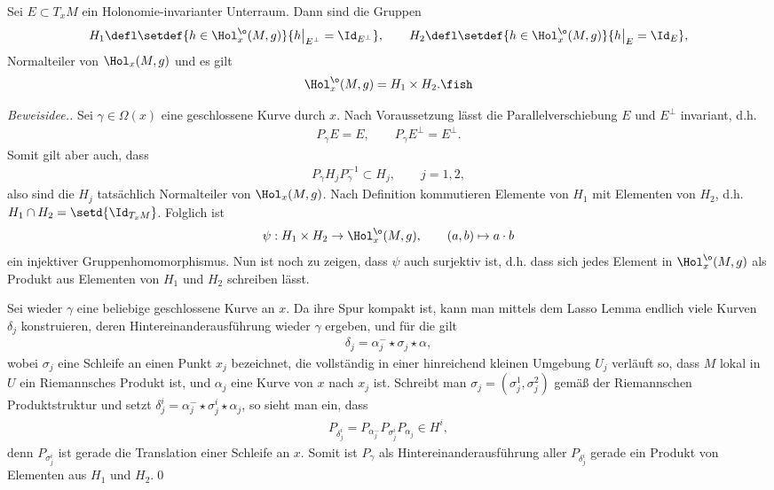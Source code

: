 \documentclass[%
	paper=a5,%
	fleqn,%
	DIV=18,%
	BCOR=0mm,
	fontsize=11pt,
	titlepage=false,%
	bibliography=totoc,
	DIV=18,%
	twoside=true,
	pdftitle=Riemannsche Geometrie,
	pdfauthor=Uwe Semmelmann,
	numbers=noendperiod]%
	{scrbook}
\begin{document}
\begin{prop}
Sei $E\subset T_{x}M$ ein Holonomie-invarianter Unterraum. Dann sind die Gruppen
\begin{align*}
H_{1} \defl \setdef{h\in \Hol_{x}^\o(M,g)}{h\big|_{E^\bot} = \Id_{E^\bot}},\qquad
H_{2} \defl \setdef{h\in \Hol_{x}^\o(M,g)}{h\big|_{E} = \Id_{E}},
\end{align*}
Normalteiler von $\Hol_{x}(M,g)$ und es gilt
\begin{align*}
\Hol_{x}^\o(M,g) = H_{1}\times H_{2}.\fish
\end{align*}
\end{prop}
\begin{proof}[Beweisidee.]
Sei $\gamma\in\Omega(x)$ eine geschlossene Kurve durch $x$. Nach Voraussetzung lässt die Parallelverschiebung $E$ und $E^\bot$ invariant, d.h.
\begin{align*}
P_{\gamma}E = E,\qquad P_{\gamma}E^\bot = E^\bot.
\end{align*}
Somit gilt aber auch, dass
\begin{align*}
P_{\gamma} H_{j} P_{\gamma}^{-1} \subset H_{j},\qquad j=1,2,
\end{align*}
also sind die $H_{j}$ tatsächlich Normalteiler von $\Hol_{x}(M,g)$. Nach Definition kommutieren Elemente von $H_{1}$ mit Elementen von $H_{2}$, d.h. $H_{1}\cap H_{2} = \setd{\Id_{T_{x}M}}$. Folglich ist
\begin{align*}
\psi: H_{1}\times H_{2}\to \Hol_{x}^\o(M,g),\qquad (a,b)\mapsto a\cdot b
\end{align*}
ein injektiver Gruppenhomomorphismus. Nun ist noch zu zeigen, dass $\psi$ auch surjektiv ist, d.h. dass sich jedes Element in $\Hol_{x}^\o(M,g)$ als Produkt aus Elementen von $H_{1}$ und $H_{2}$ schreiben lässt.

Sei wieder $\gamma$ eine beliebige geschlossene Kurve an $x$. 
Da ihre Spur kompakt ist, kann man mittels dem Lasso Lemma endlich viele Kurven $\delta_{j}$ konstruieren, deren Hintereinanderausführung wieder $\gamma$ ergeben, und für die gilt
\begin{align*}
\delta_{j} = \alpha_{j}^- \star \sigma_{j}\star \alpha,
\end{align*}
wobei $\sigma_{j}$ eine Schleife an einen Punkt $x_{j}$ bezeichnet, die vollständig in einer hinreichend kleinen Umgebung $U_{j}$ verläuft so, dass $M$ lokal in $U$ ein Riemannsches Produkt ist, und $\alpha_{j}$ eine Kurve von $x$ nach $x_{j}$ ist.
Schreibt man $\sigma_{j}=(\sigma_{j}^1,\sigma_{j}^2)$ gemäß der Riemannschen Produktstruktur und setzt $\delta_{j}^i = \alpha_{j}^-\star \sigma_{j}^i\star \alpha_{j}$, so sieht man ein, dass
\begin{align*}
P_{\delta_{j}^i} = P_{\alpha_{j}^{-}}P_{\sigma_{j}^i}P_{\alpha_{j}} \in H^i,
\end{align*}
denn $P_{\sigma_{j}^i}$ ist gerade die Translation einer Schleife an $x$. Somit
ist $P_{\gamma}$ als Hintereinanderausführung aller $P_{\delta_{j}^i}$ gerade ein Produkt von Elementen aus $H_1$ und $H_2$.\qed
\end{proof}
\end{document}
